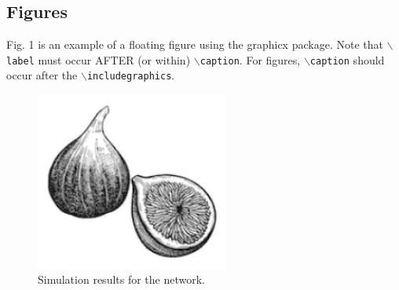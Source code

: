 \documentclass[lettersize,journal]{IEEEtran}
\begin{document}
\subsection{Figures}
Fig. 1 is an example of a floating figure using the graphicx package.
 Note that $\backslash${\tt{label}} must occur AFTER (or within) $\backslash${\tt{caption}}.
 For figures, $\backslash${\tt{caption}} should occur after the $\backslash${\tt{includegraphics}}.

\begin{figure}[!t]
\centering
\includegraphics[width=2.5in]{fig1}
\caption{Simulation results for the network.}
\label{fig_1}
\end{figure}
\end{document}
